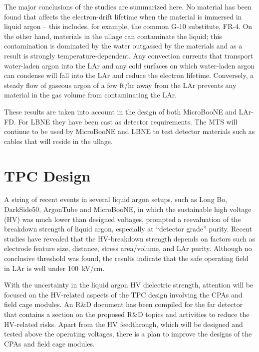 The major conclusions of the studies are summarized here. No material has been found that affects the electron-drift lifetime when the material is immersed in liquid argon -- this includes, for example, the common G-10 substitute, FR-4. On the other hand, materials in the ullage can contaminate the liquid; this contamination is dominated by the water outgassed by the materials and as a result is strongly temperature-dependent. Any convection currents that transport water-laden argon into the LAr and any cold surfaces on which water-laden argon can condense will fall into the LAr and reduce the electron lifetime. Conversely,  a steady flow of gaseous argon of a few ft/hr away from the LAr prevents any material in the gas volume from contaminating the LAr. 

These results are taken into account in the design of both MicroBooNE and LAr-FD. For LBNE they have been cast as detector requirements. The MTS will continue to be used by MicroBooNE and LBNE to test detector materials such as cables that will reside in the ullage.


\section{TPC Design}

A string of recent events in several liquid argon setups, such as Long Bo, DarkSide50, ArgonTube and MicroBooNE, in which the sustainable high voltage (HV) was much lower  than designed voltages,  prompted a reevaluation of the breakdown strength of liquid argon, especially at ``detector grade'' purity. Recent studies \cite{bib:HV_in_LAr_1}\cite{bib:HV_in_LAr_2} have revealed that the HV-breakdown strength depends on factors such as electrode feature size, distance, stress area/volume, and LAr purity. Although no conclusive threshold was found, the results indicate that the safe operating field in LAr is well under 100~kV/cm. 
 
With the uncertainty in the liquid argon HV dielectric strength, attention will be focused on the HV-related aspects of the TPC design involving the CPAs and field cage modules.  An R\&D document has been compiled for the far detector~\cite{fd_rndplan_10006} that contains a section on the proposed R\&D topics and activities to reduce the HV-related risks. Apart from the HV feedthrough, which will be designed and tested above the operating voltages, there is a plan to improve the designs of the CPAs and field cage modules.
 
